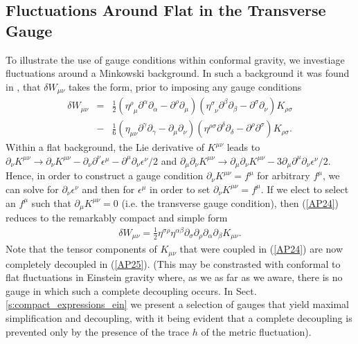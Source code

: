 \subsection{Fluctuations Around Flat in the Transverse Gauge}
\label{ss:fluctuations_around_flat_in_the_tranverse_gauge}
To illustrate the use of gauge conditions within conformal gravity, we investiage fluctuations around a Minkowski background. In such a background it was found in \cite{mannheim_2006}, that $\delta W_{\mu\nu}$ takes the form, prior to imposing any gauge conditions
%
\begin{eqnarray}
\delta W_{\mu\nu}&=&\frac{1}{2}(\eta^{\rho}_{\phantom{\rho} \mu} \partial^{\alpha}\partial_{\alpha}-\partial^{\rho}\partial_{\mu})
(\eta^{\sigma}_{\phantom{\sigma} \nu} \partial^{\beta}\partial_{\beta}-
\partial^{\sigma}\partial_{\nu})K_{\rho \sigma}
\nonumber\\
&-& 
\frac{1}{6}(\eta_{\mu \nu} \partial^{\gamma}\partial_{\gamma}-
\partial_{\mu}\partial_{\nu})(\eta^{\rho \sigma} \partial^{\delta}\partial_{\delta}-
\partial^{\rho}\partial^{\sigma})K_{\rho\sigma}.
\label{AP24}
\end{eqnarray}
%
Within a flat background, the Lie derivative of $K^{\mu\nu}$ leads to $\partial_{\nu}K^{\mu\nu}\rightarrow \partial_{\nu}K^{\mu\nu}-\partial_{\nu}\partial^{\nu}\epsilon^{\mu}-\partial^{\mu}\partial_{\nu}\epsilon^{\nu}/2$ and $\partial_{\mu}\partial_{\nu}K^{\mu\nu}\rightarrow \partial_{\mu}\partial_{\nu}K^{\mu\nu}-3\partial_{\mu}\partial^{\mu}\partial_{\nu}\epsilon^{\nu}/2$. Hence, in order to construct a gauge condition $\partial_{\nu}K^{\mu\nu} = f^\mu$ for arbitrary $f^\mu$, we can solve for $\partial_{\nu}\epsilon^{\nu}$ and then for $\epsilon^{\mu}$ in order to set $\partial_{\nu}K^{\mu\nu}=f^\mu$. If we elect to select an $f^\mu$ such that $\partial_{\mu}K^{\mu\nu}=0$ (i.e. the transverse gauge condition), then (\ref{AP24}) reduces to the remarkably compact and simple form
%
\begin{eqnarray}
\delta W_{\mu\nu}=\frac{1}{2}\eta^{\sigma\rho}\eta^{\alpha\beta}\partial_{\sigma}\partial_{\rho} \partial_{\alpha}\partial_{\beta}K_{\mu \nu}.
\label{AP25}
\end{eqnarray}
%
Note that the tensor components of $K_{\mu\nu}$ that were coupled in (\ref{AP24}) are now completely decoupled in (\ref{AP25}). (This may be constrasted with conformal to flat fluctuations in Einstein gravity where, as we as far as we aware, there is no gauge in which such a complete decoupling occurs. In Sect. \ref{s:compact_expressions_ein} we present a selection of gauges that yield maximal simplification and decoupling, with it being evident that a complete decoupling is prevented only by the presence of the trace $h$ of the metric fluctuation).

